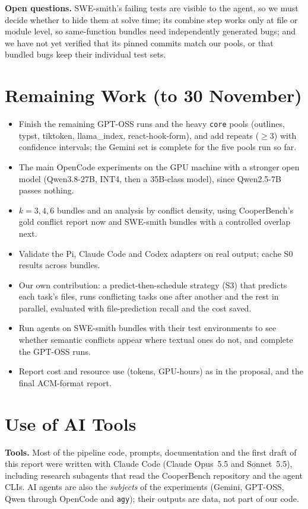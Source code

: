 \documentclass[sigconf,nonacm]{acmart}
\begin{document}
\textbf{Open questions.} SWE-smith's failing tests are visible to the agent, so we must decide whether to hide them at solve time; its combine step works only at file or module level, so same-function bundles need independently generated bugs; and we have not yet verified that its pinned commits match our pools, or that bundled bugs keep their individual test sets.

\section{Remaining Work (to 30 November)}
\begin{itemize}\itemsep0pt
\item Finish the remaining GPT-OSS runs and the heavy \texttt{core} pools (outlines, typst, tiktoken, llama\_index, react-hook-form), and add repeats ($\ge$3) with confidence intervals; the Gemini set is complete for the five pools run so far.
\item The main OpenCode experiments on the GPU machine with a stronger open model (Qwen3.8-27B, INT4, then a 35B-class model), since Qwen2.5-7B passes nothing.
\item $k=3,4,6$ bundles and an analysis by conflict density, using CooperBench's gold conflict report now and SWE-smith bundles with a controlled overlap next.
\item Validate the Pi, Claude Code and Codex adapters on real output; cache S0 results across bundles.
\item Our own contribution: a predict-then-schedule strategy (S3) that predicts each task's files, runs conflicting tasks one after another and the rest in parallel, evaluated with file-prediction recall and the cost saved.
\item Run agents on SWE-smith bundles with their test environments to see whether semantic conflicts appear where textual ones do not, and complete the GPT-OSS runs.\item Report cost and resource use (tokens, GPU-hours) as in the proposal, and the final ACM-format report.
\end{itemize}

\section{Use of AI Tools}
\textbf{Tools.} Most of the pipeline code, prompts, documentation and the first draft of this report were written with Claude Code (Claude Opus~5.5 and Sonnet~5.5), including research subagents that read the CooperBench repository and the agent CLIs. AI agents are also the \emph{subjects} of the experiments (Gemini, GPT-OSS, Qwen through OpenCode and \texttt{agy}); their outputs are data, not part of our code.
\end{document}
